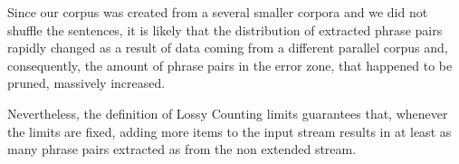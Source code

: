 Since our corpus was created from a several smaller corpora and we did not shuffle the sentences,
it is likely that the distribution of extracted phrase pairs rapidly changed as a result of data
coming from a different parallel corpus and, consequently, the amount of phrase pairs in the error zone,
that happened to be pruned, massively increased.

Nevertheless, the definition of Lossy Counting limits guarantees that,
whenever the limits are fixed, adding more items to the input stream results in at least
as many phrase pairs extracted as from the non extended stream.
